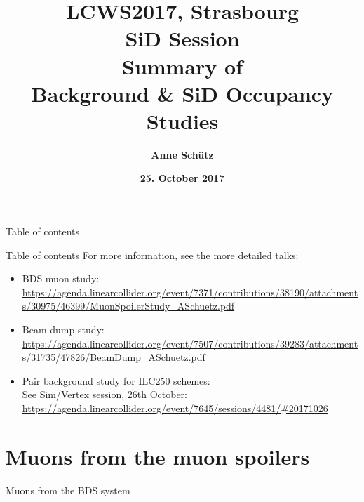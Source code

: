 \documentclass[xcolor={dvipsnames}]{beamer}
\title[ILC backgrounds \& SiD Occupancy]{\textbf{\alert{LCWS2017, Strasbourg\\SiD Session} \\ \vspace*{0.3cm} \LARGE  Summary of \\Background \& SiD Occupancy Studies}}
\author{\textbf{Anne Sch\"utz}}
\institute{\textbf{DESY}}
\date{\textbf{25. October 2017}}
\begin{document}
{
\begin{frame}
  \titlepage
\end{frame}
}
\setcounter{tocdepth}{2}
\begin{frame}{Table of contents}
  \tableofcontents
\end{frame}
\begin{frame}{Table of contents}
  For more information, see the more detailed talks:
  \begin{itemize}
   \item \alert{BDS muon study}:\\
   {\small
   \url{https://agenda.linearcollider.org/event/7371/contributions/38190/attachments/30975/46399/MuonSpoilerStudy_ASchuetz.pdf}
   }
   \item \alert{Beam dump study}:\\
   {\small
   \url{https://agenda.linearcollider.org/event/7507/contributions/39283/attachments/31735/47826/BeamDump_ASchuetz.pdf}
   }
   \item \alert{Pair background study for ILC250 schemes}:\\
   {\small
   See Sim/Vertex session, 26th October:\\
   \url{https://agenda.linearcollider.org/event/7645/sessions/4481/\#20171026}
   }
  \end{itemize}
\end{frame}


\section{Muons from the muon spoilers}
\begin{frame}
 \begin{center}
  {\LARGE Muons from the BDS system}
 \end{center}
\end{frame}
\end{document}
